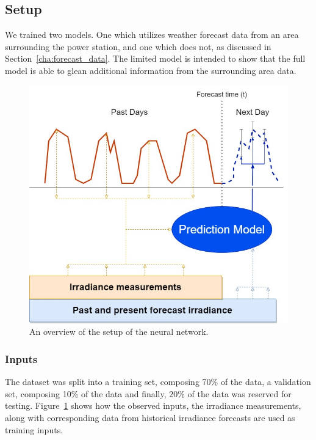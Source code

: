     \subsection{Setup}
    We trained two models. One which utilizes weather forecast data from an area surrounding the power station, and one which does not, as discussed in Section~\ref{cha:forecast_data}. The limited model is intended to show that the full model is able to glean additional information from the surrounding area data.
    
    
    
    \begin{figure}[ht!]
        \centering
        \includegraphics[scale=0.6]{imgs/solar_TFT_overview.jpg}
        \caption{An overview of the setup of the neural network.
        \label{fig:solar_tft_overviwew}}
    \end{figure}


    \subsubsection{Inputs}
        The dataset was split into a training set, composing 70\% of the data, a validation set, composing 10\% of the data and finally, 20\% of the data was reserved for testing.
        Figure~\ref{fig:solar_tft_overviwew} shows how the observed inputs, the irradiance measurements, along with corresponding data from historical irradiance forecasts are used as training inputs.
        
